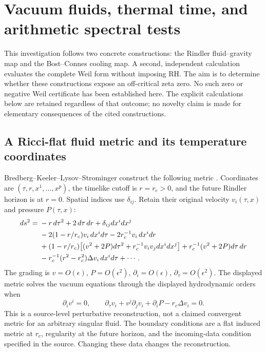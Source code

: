 \section{Vacuum fluids, thermal time, and arithmetic spectral tests}
\label{sec:rh-counterexample-routes}

This investigation follows two concrete constructions: the Rindler
fluid--gravity map and the Bost--Connes cooling map. A second, independent
calculation evaluates the complete Weil form without imposing RH. The aim is
to determine whether these constructions expose an off-critical zeta zero.
No such zero or negative Weil certificate has been established here.
The explicit calculations below are retained regardless of that outcome;
no novelty claim is made for elementary consequences of the cited constructions.

\subsection{A Ricci-flat fluid metric and its temperature coordinates}

Bredberg--Keeler--Lysov--Strominger construct the following metric
\cite[\S5.1, (14)--(20)]{bkls2011}. Coordinates are
$(\tau,r,x^1,\ldots,x^p)$, the timelike cutoff is $r=r_c>0$, and
the future Rindler horizon is at $r=0$. Spatial indices use $\delta_{ij}$.
Retain their original velocity $v_i(\tau,x)$ and pressure $P(\tau,x)$:
\begin{align}
 ds^2={}&-r\,d\tau^2+2\,d\tau\,dr+\delta_{ij}dx^i dx^j \notag\\
 &-2(1-r/r_c)v_i\,dx^i d\tau-2r_c^{-1}v_i\,dx^i dr \notag\\
 &+(1-r/r_c)\bigl[(v^2+2P)d\tau^2+r_c^{-1}v_i v_jdx^i dx^j\bigr]
   +r_c^{-1}(v^2+2P)d\tau\,dr \notag\\
 &-r_c^{-1}(r^2-r_c^2)\Delta v_i\,dx^i d\tau+\cdots .
 \label{eq:rh-bkls-metric}
\end{align}
The grading is $v=O(\epsilon)$, $P=O(\epsilon^2)$,
$\partial_i=O(\epsilon)$, $\partial_\tau=O(\epsilon^2)$.
The displayed metric solves the vacuum equations through the displayed
hydrodynamic orders when
\begin{equation}
 \partial_i v^i=0,\qquad
 \partial_\tau v_i+v^j\partial_jv_i+\partial_iP-r_c\Delta v_i=0.
 \label{eq:rh-bkls-ns}
\end{equation}
This is a source-level perturbative reconstruction, not a claimed convergent
metric for an arbitrary singular fluid. The boundary conditions are a flat
induced metric at $r_c$, regularity at the future horizon, and the incoming-data
condition specified in the source. Changing these data changes the reconstruction.

